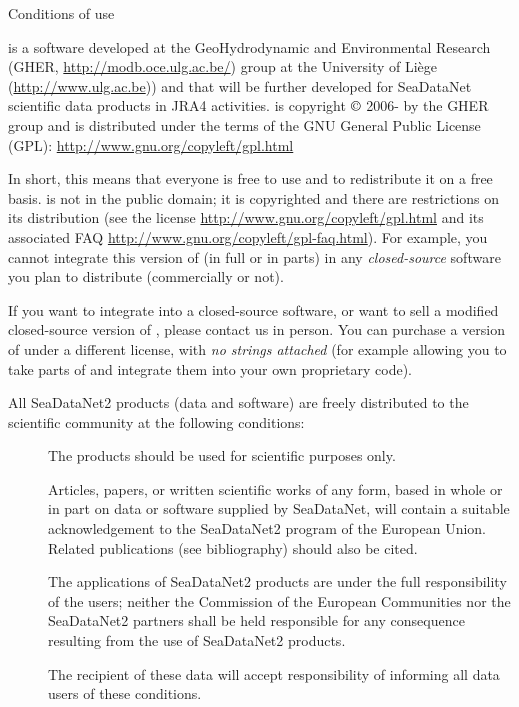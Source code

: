 
\vspace*{\fill}

\begin{center}
\begin{minipage}[c]{.85\textwidth}

\Large{Conditions of use}
\vspace{1cm}
\normalsize

 
\vspace{.25cm}
\diva is a software developed at the GeoHydrodynamic and Environmental Research (GHER, \url{http://modb.oce.ulg.ac.be/}) group at the University of Liège (\url{http://www.ulg.ac.be})) and that will be further developed for SeaDataNet scientific data products in \textsf{JRA4} activities. \diva is copyright $\copyright$  2006-\the\year\xspace by the GHER group and is distributed under the terms of the GNU General Public License (GPL): \url{http://www.gnu.org/copyleft/gpl.html} 

In short, this means that everyone is free to use \diva and to redistribute it on a free basis. \diva is not in the public domain; it is copyrighted and there are restrictions on its distribution (see the license \url{http://www.gnu.org/copyleft/gpl.html} and its associated FAQ \url{http://www.gnu.org/copyleft/gpl-faq.html}). For example, you cannot integrate this version of \diva (in full or in parts) in any \textit{closed-source} software you plan to distribute (commercially or not).

If you want to integrate \diva into a closed-source software, or want to sell a modified closed-source version of \diva, please contact us in person. You can purchase a version of \diva under a different license, with \textit{no strings attached} (for example allowing you to take parts of \diva and integrate them into your own proprietary code).

\vspace{.25cm}
All SeaDataNet2 products (data and software) are freely distributed to the scientific community at the following conditions: 

\begin{description}
\item[\checkmark] The products should be used for scientific purposes only.
\item[\checkmark] Articles, papers, or written scientific works of any form, based in whole or in part on data or software supplied by SeaDataNet, will contain a suitable acknowledgement to the SeaDataNet2 program of the European Union. Related publications (see bibliography) should also be cited.
\item[\checkmark] The applications of SeaDataNet2 products are under the full responsibility of the users; neither the Commission of the European Communities nor the SeaDataNet2 partners shall be held responsible for any consequence resulting from the use of SeaDataNet2 products. 
\item[\checkmark] The recipient of these data will accept responsibility of informing all data users of these conditions.
\end{description}


\end{minipage}
\end{center}
